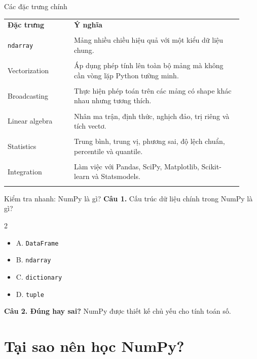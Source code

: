 \documentclass[aspectratio=169,11pt]{beamer}
\newcommand{\quiztitle}[1]{\textbf{\textcolor{QuizOrange}{#1}}}
\begin{document}
\begin{frame}{Các đặc trưng chính}
\scriptsize
\begin{tabular}{p{0.26\linewidth}p{0.66\linewidth}}
\toprule
\textbf{Đặc trưng} & \textbf{Ý nghĩa} \\\\
\midrule
\texttt{ndarray} & Mảng nhiều chiều hiệu quả với một kiểu dữ liệu chung. \\\\
Vectorization & Áp dụng phép tính lên toàn bộ mảng mà không cần vòng lặp Python tường minh. \\\\
Broadcasting & Thực hiện phép toán trên các mảng có shape khác nhau nhưng tương thích. \\\\
Linear algebra & Nhân ma trận, định thức, nghịch đảo, trị riêng và tích vectơ. \\\\
Statistics & Trung bình, trung vị, phương sai, độ lệch chuẩn, percentile và quantile. \\\\
Integration & Làm việc với Pandas, SciPy, Matplotlib, Scikit-learn và Statsmodels. \\\\
\bottomrule
\end{tabular}
\end{frame}

\begin{frame}{Kiểm tra nhanh: NumPy là gì?}
\small
\quiztitle{Câu 1.} Cấu trúc dữ liệu chính trong NumPy là gì?
\begin{multicols}{2}
\begin{itemize}
  \item A. \texttt{DataFrame}
  \item B. \texttt{ndarray}
  \item C. \texttt{dictionary}
  \item D. \texttt{tuple}
\end{itemize}
\end{multicols}
\vspace{0.8em}
\quiztitle{Câu 2. Đúng hay sai?} NumPy được thiết kế chủ yếu cho tính toán số.
\end{frame}

\section{Tại sao nên học NumPy?}
\end{document}
